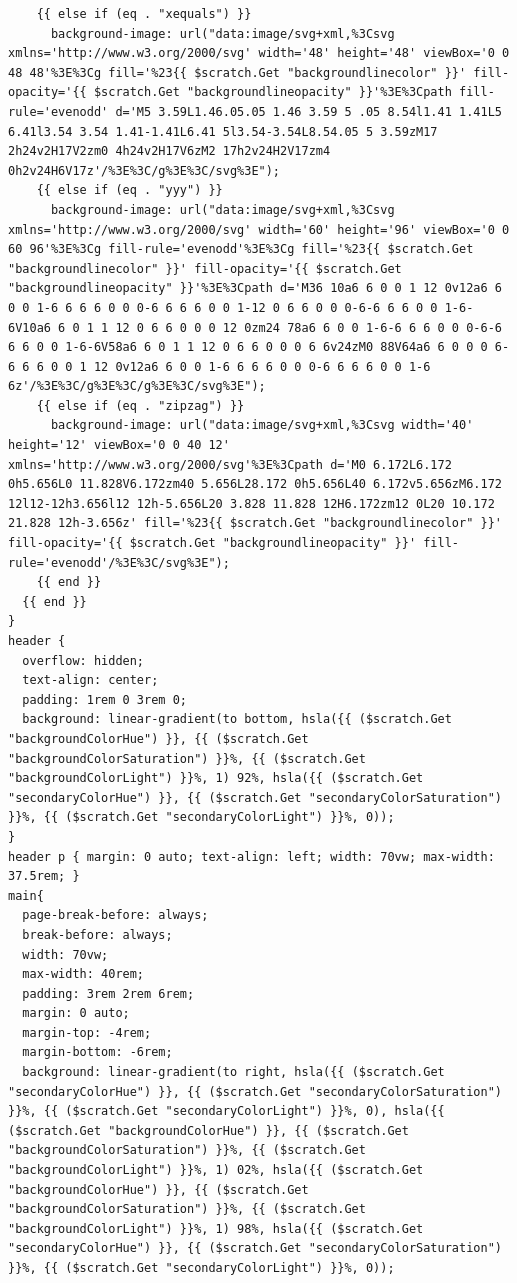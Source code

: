 \documentclass[11pt]{article}
\begin{document}
\begin{enumerate}
\begin{verbatim}
    {{ else if (eq . "xequals") }}
      background-image: url("data:image/svg+xml,%3Csvg xmlns='http://www.w3.org/2000/svg' width='48' height='48' viewBox='0 0 48 48'%3E%3Cg fill='%23{{ $scratch.Get "backgroundlinecolor" }}' fill-opacity='{{ $scratch.Get "backgroundlineopacity" }}'%3E%3Cpath fill-rule='evenodd' d='M5 3.59L1.46.05.05 1.46 3.59 5 .05 8.54l1.41 1.41L5 6.41l3.54 3.54 1.41-1.41L6.41 5l3.54-3.54L8.54.05 5 3.59zM17 2h24v2H17V2zm0 4h24v2H17V6zM2 17h2v24H2V17zm4 0h2v24H6V17z'/%3E%3C/g%3E%3C/svg%3E");
    {{ else if (eq . "yyy") }}
      background-image: url("data:image/svg+xml,%3Csvg xmlns='http://www.w3.org/2000/svg' width='60' height='96' viewBox='0 0 60 96'%3E%3Cg fill-rule='evenodd'%3E%3Cg fill='%23{{ $scratch.Get "backgroundlinecolor" }}' fill-opacity='{{ $scratch.Get "backgroundlineopacity" }}'%3E%3Cpath d='M36 10a6 6 0 0 1 12 0v12a6 6 0 0 1-6 6 6 6 0 0 0-6 6 6 6 0 0 1-12 0 6 6 0 0 0-6-6 6 6 0 0 1-6-6V10a6 6 0 1 1 12 0 6 6 0 0 0 12 0zm24 78a6 6 0 0 1-6-6 6 6 0 0 0-6-6 6 6 0 0 1-6-6V58a6 6 0 1 1 12 0 6 6 0 0 0 6 6v24zM0 88V64a6 6 0 0 0 6-6 6 6 0 0 1 12 0v12a6 6 0 0 1-6 6 6 6 0 0 0-6 6 6 6 0 0 1-6 6z'/%3E%3C/g%3E%3C/g%3E%3C/svg%3E");
    {{ else if (eq . "zipzag") }}
      background-image: url("data:image/svg+xml,%3Csvg width='40' height='12' viewBox='0 0 40 12' xmlns='http://www.w3.org/2000/svg'%3E%3Cpath d='M0 6.172L6.172 0h5.656L0 11.828V6.172zm40 5.656L28.172 0h5.656L40 6.172v5.656zM6.172 12l12-12h3.656l12 12h-5.656L20 3.828 11.828 12H6.172zm12 0L20 10.172 21.828 12h-3.656z' fill='%23{{ $scratch.Get "backgroundlinecolor" }}' fill-opacity='{{ $scratch.Get "backgroundlineopacity" }}' fill-rule='evenodd'/%3E%3C/svg%3E");
    {{ end }}
  {{ end }}
}
header {
  overflow: hidden;
  text-align: center;
  padding: 1rem 0 3rem 0;
  background: linear-gradient(to bottom, hsla({{ ($scratch.Get "backgroundColorHue") }}, {{ ($scratch.Get "backgroundColorSaturation") }}%, {{ ($scratch.Get "backgroundColorLight") }}%, 1) 92%, hsla({{ ($scratch.Get "secondaryColorHue") }}, {{ ($scratch.Get "secondaryColorSaturation") }}%, {{ ($scratch.Get "secondaryColorLight") }}%, 0));
}
header p { margin: 0 auto; text-align: left; width: 70vw; max-width: 37.5rem; }
main{
  page-break-before: always;
  break-before: always;
  width: 70vw;
  max-width: 40rem;
  padding: 3rem 2rem 6rem;
  margin: 0 auto;
  margin-top: -4rem;
  margin-bottom: -6rem;
  background: linear-gradient(to right, hsla({{ ($scratch.Get "secondaryColorHue") }}, {{ ($scratch.Get "secondaryColorSaturation") }}%, {{ ($scratch.Get "secondaryColorLight") }}%, 0), hsla({{ ($scratch.Get "backgroundColorHue") }}, {{ ($scratch.Get "backgroundColorSaturation") }}%, {{ ($scratch.Get "backgroundColorLight") }}%, 1) 02%, hsla({{ ($scratch.Get "backgroundColorHue") }}, {{ ($scratch.Get "backgroundColorSaturation") }}%, {{ ($scratch.Get "backgroundColorLight") }}%, 1) 98%, hsla({{ ($scratch.Get "secondaryColorHue") }}, {{ ($scratch.Get "secondaryColorSaturation") }}%, {{ ($scratch.Get "secondaryColorLight") }}%, 0));

\end{verbatim}
\end{enumerate}
\end{document}
